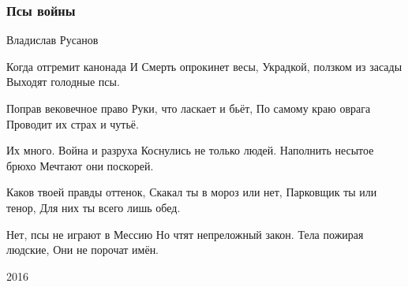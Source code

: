  
 
 

\subsubsection{Псы войны}
\label{sec:poetry.rus.dnr.vladislav_rusanov.psy_vojny}

Владислав Русанов

Когда отгремит канонада
И Смерть опрокинет весы,
Украдкой, ползком из засады
Выходят голодные псы.

Поправ вековечное право
Руки, что ласкает и бьёт,
По самому краю оврага
Проводит их страх и чутьё.

Их много. Война и разруха
Коснулись не только людей.
Наполнить несытое брюхо
Мечтают они поскорей.

Каков твоей правды оттенок,
Скакал ты в мороз или нет,
Парковщик ты или тенор,
Для них ты всего лишь обед.

Нет, псы не играют в Мессию
Но чтят непреложный закон.
Тела пожирая людские,
Они не порочат имён.

2016
